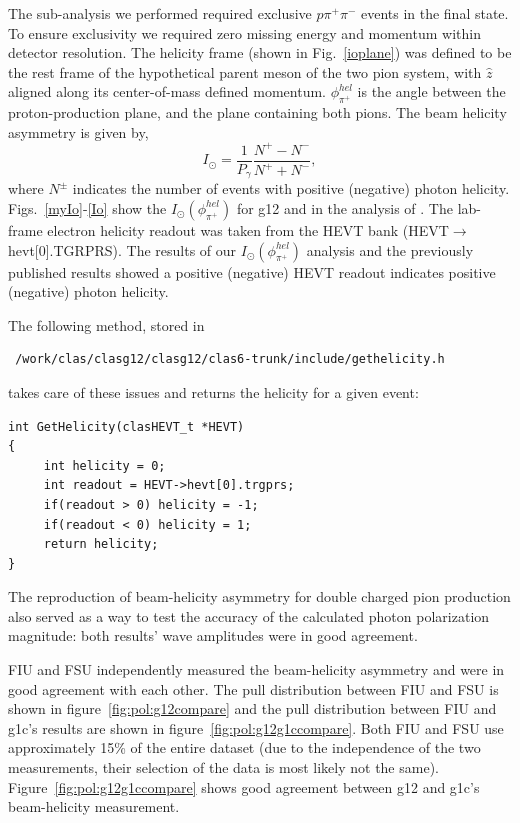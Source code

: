 The sub-analysis we performed required exclusive $p \pi^+ \pi^-$ events in the final state. To ensure exclusivity we required zero missing energy and momentum within detector resolution. The helicity frame (shown in Fig.~\ref{ioplane}) was defined to be the rest frame of the hypothetical parent meson of the two pion system, with  $\hat{z}$ aligned along its center-of-mass defined momentum. $\phi^{hel}_{\pi^+}$ is the angle between the proton-production plane, and the plane containing both pions. The beam helicity asymmetry is given by,
\begin{equation}
I_\odot = \frac{1}{P_{\gamma}} \frac{N^+ - N^-}{N^+ + N^-},
\end{equation}
where $N^\pm$ indicates the number of events with positive (negative) photon helicity.  Figs.~\ref{myIo}-\ref{Io} show the $I_{\odot}(\phi^{hel}_{\pi^+})$ for g12 and in the analysis of \cite{Io}.
The lab-frame electron helicity readout was taken from the HEVT bank (HEVT$\to$hevt[0].TGRPRS). The results of our $I_{\odot}(\phi^{hel}_{\pi^+})$ analysis and the previously published results showed a positive (negative) HEVT readout indicates positive (negative) photon helicity. \begin{v2}The following method, stored in\begin{verbatim} /work/clas/clasg12/clasg12/clas6-trunk/include/gethelicity.h \end{verbatim} takes care of these issues and returns the helicity for a given event:

\begin{verbatim}
int GetHelicity(clasHEVT_t *HEVT)
{
     int helicity = 0;
     int readout = HEVT->hevt[0].trgprs;
     if(readout > 0) helicity = -1;
     if(readout < 0) helicity = 1;
     return helicity;
}
\end{verbatim}
\end{v2}
The reproduction of beam-helicity asymmetry for double charged pion production also served as a way to test the accuracy of the calculated photon polarization magnitude: both results' wave amplitudes were in good agreement. \begin{v2}
FIU and FSU independently measured the beam-helicity asymmetry and were in good agreement with each other. The pull distribution between FIU and FSU is shown in figure~\ref{fig:pol:g12compare} and the pull distribution between FIU and g1c's results are shown in figure~\ref{fig:pol:g12g1ccompare}. Both FIU and FSU use approximately 15\% of the entire dataset (due to the independence of the two measurements, their selection of the data is most likely not the same). Figure~\ref{fig:pol:g12g1ccompare} shows good agreement between g12 and g1c's beam-helicity measurement.
\end{v2}

